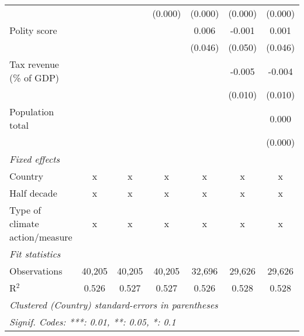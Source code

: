 \begin{tabular}{lcccccc}
                                                                                        &         &                & (0.000)        & (0.000)        & (0.000)        & (0.000)\\   
   Polity score                                                                         &         &                &                & 0.006          & -0.001         & 0.001\\   
                                                                                        &         &                &                & (0.046)        & (0.050)        & (0.046)\\   
   Tax revenue (\% of GDP)                                                              &         &                &                &                & -0.005         & -0.004\\   
                                                                                        &         &                &                &                & (0.010)        & (0.010)\\   
   Population total                                                                     &         &                &                &                &                & 0.000\\   
                                                                                        &         &                &                &                &                & (0.000)\\   
   \emph{Fixed effects}\\
   Country                                                                              & x       & x              & x              & x              & x              & x\\  
   Half decade                                                                          & x       & x              & x              & x              & x              & x\\  
   Type of climate action/measure                                                       & x       & x              & x              & x              & x              & x\\  
   \midrule \emph{Fit statistics}\\
   Observations                                                                         & 40,205  & 40,205         & 40,205         & 32,696         & 29,626         & 29,626\\  
   R$^2$                                                                                & 0.526   & 0.527          & 0.527          & 0.526          & 0.528          & 0.528\\  
   \midrule
   \multicolumn{7}{l}{\emph{Clustered (Country) standard-errors in parentheses}}\\
   \multicolumn{7}{l}{\emph{Signif. Codes: ***: 0.01, **: 0.05, *: 0.1}}\\
\end{tabular}
\par\endgroup


